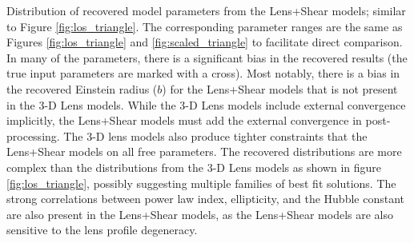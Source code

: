 \label{fig:shear_triangle} Distribution of recovered model parameters from the Lens+Shear models; similar to Figure \ref{fig:los_triangle}. The corresponding parameter ranges are the same as Figures \ref{fig:los_triangle} and \ref{fig:scaled_triangle} to facilitate direct comparison. In many of the parameters, there is a significant bias in the recovered results (the true input parameters are marked with a cross). Most notably, there is a bias in the recovered Einstein radius ($b$) for the Lens+Shear models that is not present in the 3-D Lens models. While the 3-D Lens models include external convergence implicitly, the Lens+Shear models must add the external convergence in post-processing. The 3-D lens models also produce tighter constraints that the Lens+Shear models on all free parameters. The recovered distributions are more complex than the distributions from the 3-D Lens models as shown in figure \ref{fig:los_triangle}, possibly suggesting multiple families of best fit solutions. The strong correlations between power law index, ellipticity, and the Hubble constant are also present in the Lens+Shear models, as the Lens+Shear models are also sensitive to the lens profile degeneracy. 